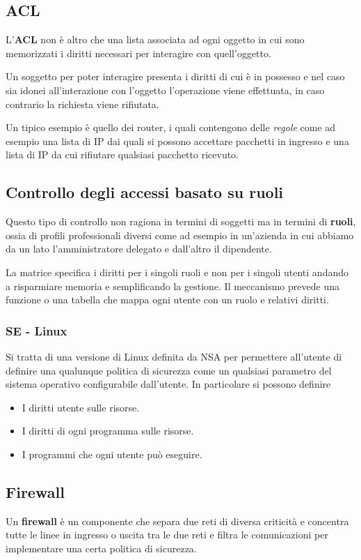 \subsection{ACL}
L'\textbf{ACL} non è altro che una lista associata ad ogni oggetto in cui sono memorizzati i diritti necessari per
interagire con quell'oggetto.

Un soggetto per poter interagire presenta i diritti di cui è in possesso e nel caso sia idonei all'interazione con
l'oggetto l'operazione viene effettuata, in caso contrario la richiesta viene rifiutata.

Un tipico esempio è quello dei router, i quali contengono delle \emph{regole} come ad esempio una lista di IP dai
quali si possono accettare pacchetti in ingresso e una lista di IP da cui rifiutare qualsiasi pacchetto ricevuto.

\subsection{Controllo degli accessi basato su ruoli}
Questo tipo di controllo non ragiona in termini di soggetti ma in termini di \textbf{ruoli}, ossia di profili
professionali diversi come ad esempio in un'azienda in cui abbiamo da un lato l'amministratore delegato e dall'altro
il dipendente.

La matrice specifica i diritti per i singoli ruoli e non per i singoli utenti andando a risparmiare memoria e
semplificando la gestione. Il meccanismo prevede una funzione o una tabella che mappa ogni utente con un ruolo e
relativi diritti.

\subsubsection{SE - Linux}
Si tratta di una versione di Linux definita da NSA per permettere all'utente di definire una qualunque politica di
sicurezza come un qualsiasi parametro del sistema operativo configurabile dall'utente. In particolare si possono
definire
\begin{itemize}
	\item I diritti utente sulle risorse.
	\item I diritti di ogni programma sulle risorse.
	\item I programmi che ogni utente può eseguire.
\end{itemize}

\subsection{Firewall}
Un \textbf{firewall} è un componente che separa due reti di diversa criticità e concentra tutte le linee in ingresso o
uscita tra le due reti e filtra le comunicazioni per implementare una certa politica di sicurezza.

